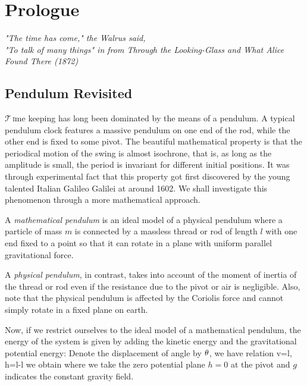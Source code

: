 \chapter{Prologue}
\setcounter{section}{0}
{\flushright
	{\sffamily\slshape
		"The time has come," the Walrus said,\\
		"To talk of many things"
		 in
		{from \it Through the Looking-Glass and What Alice Found There \rm (1872)}
	}	
\vskip 2in 
}
\section{Pendulum Revisited\hfill}
\lettrine[lines=2]{$\mathscr{T}$\,}\lowercase{i}me keeping has long been dominated by the means of a pendulum. A typical pendulum clock features a massive pendulum on one end of the rod, while the other end is fixed to some pivot. The beautiful mathematical property is that the periodical motion of the swing is almost isochrone, that is, as long as the amplitude is small, the period is invariant for different initial positions. It was through experimental fact that this property got first discovered by the young talented Italian Galileo Galilei at around 1602. We shall investigate this phenomenon through a more mathematical approach.

A {\it mathematical pendulum} is an ideal model of a physical pendulum 
where a particle of mass $m$ is connected by a massless thread or rod 
of length $l$ with one end fixed to a point so that it can rotate in a plane 
with uniform parallel gravitational force. \cite{awrejcewicz2012classical}

A {\it physical pendulum}, in contrast, takes into account of the moment of inertia of the thread or rod even if the resistance due to the pivot or air is
negligible. Also, note that the physical pendulum is affected by the Coriolis force
and cannot simply rotate in a fixed plane on earth.

Now, if we restrict ourselves to the ideal model of a mathematical pendulum,
the energy of the system is given by adding the kinetic energy and the 
gravitational potential energy:
Denote the displacement of angle by $\theta$, we have relation
\eq
{
v=l\dot{\ta}, \qquad h=l-l\ct
}
we obtain
where we take the zero potential plane $h=0$ at the pivot and $g$ indicates the
constant gravity field.

